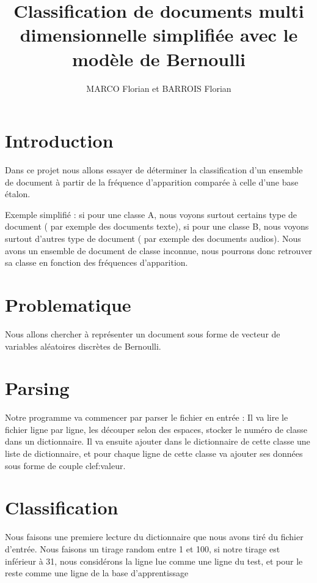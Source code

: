 \documentclass[a4paper,11pt]{article}
\title{Classification de documents multi dimensionnelle simplifiée avec le modèle de Bernoulli}
\author{MARCO Florian et BARROIS Florian}
\date{}
\begin{document}
\maketitle

\section{Introduction}

Dans ce projet nous allons essayer de déterminer la classification d'un ensemble de document à partir de la fréquence d'apparition comparée à celle d'une base étalon.

Exemple simplifié : si pour une classe A, nous voyons surtout certains type de document ( par exemple des documents texte), si pour une classe B, nous voyons surtout d'autres type de document ( par exemple des documents audios). 
Nous avons un ensemble de document de classe inconnue, nous pourrons donc retrouver sa classe en fonction des fréquences d'apparition.

\section{Problematique}

Nous allons chercher à représenter un document sous forme de vecteur de variables aléatoires discrètes de Bernoulli. 

\section{Parsing}

Notre programme va commencer par parser le fichier en entrée :
Il va lire le fichier ligne par ligne, les découper selon des espaces, stocker le numéro de classe dans un dictionnaire.
Il va ensuite ajouter dans le dictionnaire de cette classe une liste de dictionnaire, et pour chaque ligne de cette classe va ajouter ses données sous forme de couple clef:valeur.

\section{Classification}

Nous faisons une premiere lecture du dictionnaire que nous avons tiré du fichier d'entrée. 
Nous faisons un tirage random entre 1 et 100, si notre tirage est inférieur à 31, nous considérons la ligne lue comme une ligne du test, et pour le reste comme une ligne de la base d'apprentissage
\end{document}
